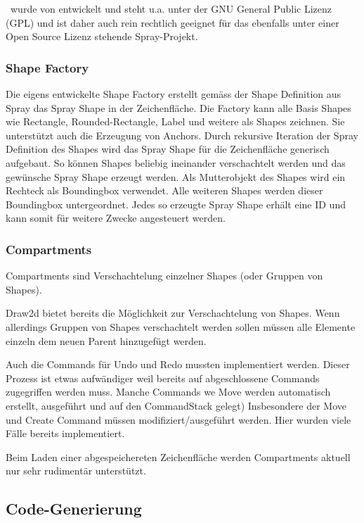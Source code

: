 \noindent \dd~wurde von \citep{dd} entwickelt und steht u.a. unter der GNU General
Public Lizenz (GPL) und ist daher auch rein rechtlich geeignet für
das ebenfalls unter einer Open Source Lizenz stehende Spray-Projekt.

\subsubsection{Shape Factory}

Die eigens entwickelte Shape Factory erstellt gemäss der Shape Definition aus Spray das Spray Shape in der Zeichenfläche.
Die Factory kann alle Basis Shapes wie Rectangle, Rounded-Rectangle, Label und weitere als \dd Shapes zeichnen.
Sie unterstützt auch die Erzeugung von Anchors. Durch rekursive Iteration der Spray Definition des Shapes wird
das Spray Shape für die Zeichenfläche generisch aufgebaut. So können \dd Shapes beliebig ineinander verschachtelt werden
und das gewünsche Spray Shape erzeugt werden. Als Mutterobjekt des Shapes wird ein Rechteck als Boundingbox verwendet.
Alle weiteren Shapes werden dieser Boundingbox untergeordnet. Jedes so erzeugte Spray Shape erhält eine \dd ID und kann somit
für weitere Zwecke angesteuert werden.

\subsubsection{Compartments}

Compartments sind Verschachtelung einzelner Shapes (oder Gruppen von Shapes).

Draw2d bietet bereits die Möglichkeit zur Verschachtelung von Shapes.
Wenn allerdings Gruppen von Shapes verschachtelt werden sollen müssen alle Elemente einzeln dem neuen Parent hinzugefügt werden.

Auch die Commands für Undo und Redo mussten implementiert werden.
Dieser Prozess ist etwas aufwändiger weil bereits auf abgeschlossene Commands zugegriffen werden muss. 
Manche Commands we Move werden automatisch erstellt, ausgeführt und auf den CommandStack gelegt)
Insbesondere der Move und Create Command müssen modifiziert/ausgeführt werden.
Hier wurden viele Fälle bereits implementiert.

Beim Laden einer abgespeichereten Zeichenfläche werden Compartments aktuell nur sehr rudimentär unterstützt.

\subsection{Code-Generierung}


